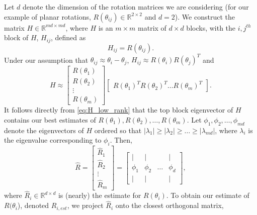 \documentclass{pnastwo}
\begin{document}
\begin{article}
Let $d$ denote the dimension of the rotation matrices we are considering (for our example of planar rotations, $R(\theta_{ij}) \in \mathbb{R}^{2 \times 2}$ and $d=2$).
%
We construct the matrix $H \in \mathbb{R}^{md \times md}$, where $H$ is an $m \times m$ matrix of $d \times d$ blocks, with the $i,j^{th}$ block of $H$, $H_{ij}$, defined as
\begin{equation} \label{eq:H_to_R}
H_{ij} = R(\theta_{ij}).
\end{equation}
%
%
Under our assumption that $\theta_{ij} \approx \theta_i - \theta_j$, $H_{ij} \approx R(\theta_i) R(\theta_j)^T$
 and
\begin{equation} \label{eq:H_low_rank}
	H \approx
	\begin{bmatrix}
	R(\theta_1) \\
	R(\theta_2) \\
	\vdots \\
	R(\theta_m)
	\end{bmatrix}
	\begin{bmatrix}
	R(\theta_1)^T R(\theta_2)^T \dots R(\theta_m)^T
	\end{bmatrix}.
\end{equation}
%
It follows directly from \eqref{eq:H_low_rank} that the top block eigenvector of $H$ contains our best estimates of $R(\theta_1), R(\theta_2), \dots, R(\theta_m)$.
%
Let $\phi_1, \phi_2, \dots, \phi_{md}$ denote the eigenvectors of $H$ ordered so that $|\lambda_1| \ge |\lambda_2| \ge \dots \ge |\lambda_{md}|$, where $\lambda_i$ is the eigenvalue corresponding to $\phi_i$.
%
Then,
\begin{equation} \label{eq:R_hat}
\hat{R} =
\begin{bmatrix}
\hat{R}_1 \\
\hat{R}_2 \\
\vdots \\
\hat{R}_m
\end{bmatrix} =
\begin{bmatrix}
| & | & & | \\
\phi_1 & \phi_2 & \dots & \phi_d \\
| & | & & |
\end{bmatrix},
\end{equation}
where $\hat{R}_i \in \mathbb{R}^{d \times d}$ is (nearly) the estimate for $R(\theta_i)$.
%
To obtain our estimate of $R(\theta_i$), denoted $R_{i, est}$, we project $\hat{R}_i$ onto the closest orthogonal matrix,

\end{article}
\end{document}
